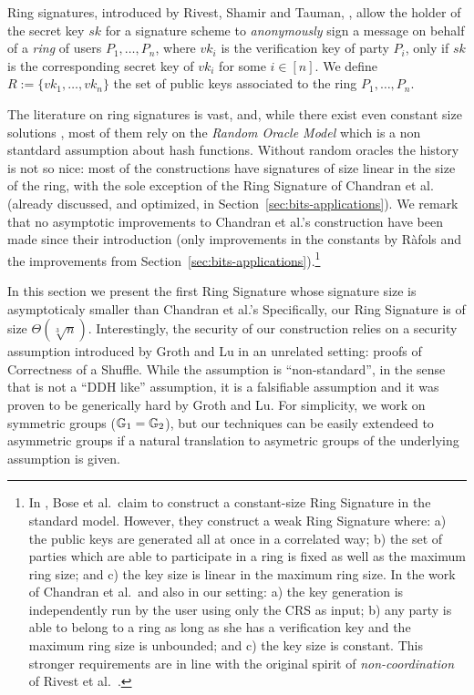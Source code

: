 Ring signatures, introduced by Rivest, Shamir and Tauman, \cite{AC:RivShaTau01}, allow the holder of the secret key $sk$ for a signature scheme to \emph{anonymously} sign a message on behalf of a \emph{ring} of users $P_1,\ldots,P_n$, where $vk_i$ is the verification key of party $P_i$, only if $sk$ is the corresponding secret key of $vk_i$ for some $i\in[n]$. We define $R:=\{vk_1,\ldots,vk_n\}$ the set of public keys associated to the ring $P_1,\ldots,P_n$.

The literature on ring signatures is vast, and, while there exist even constant size solutions \cite{EC:DKNS04}, most of them rely on the \emph{Random Oracle Model} which is a non stantdard assumption about hash functions. Without random oracles the history is not so nice: most of the constructions have signatures of size linear in the size of the ring, with the sole exception of the Ring Signature of Chandran et al.~\cite{ICALP:ChaGroSah07} (already discussed, and optimized, in Section~\ref{sec:bits-applications}). We remark that no asymptotic improvements to Chandran et al.'s construction have been made since their introduction (only improvements in the constants by R\`afols \cite{TCC:Rafols15} and the improvements from Section~\ref{sec:bits-applications}).\footnote{In \cite{ACISP:BosDasRan15}, Bose et al.~claim to construct a constant-size Ring Signature in the standard model. However, they construct a weak Ring Signature where: a) the public keys are generated all at once in a correlated way; b) the set of parties which are able to participate in a ring is fixed as well as the maximum ring size; and c) the key size is linear in the maximum ring size. In the work of Chandran et al.~and also in our setting: a) the key generation is independently run by the user using only the CRS as input; b) any party is able to belong to a ring as long as she has a verification key and the maximum ring size is unbounded; and c) the key size is constant. This stronger requirements are in line with the original spirit of \emph{non-coordination} of  Rivest et al.~\cite{AC:RivShaTau01}.}

In this section we present the first Ring Signature whose signature size is asymptoticaly smaller than Chandran et al.'s Specifically, our Ring Signature is of size $\Theta(\sqrt[3]{n})$. Interestingly, the security of our construction relies on a security assumption introduced by Groth and Lu \cite{AC:GroLu07} in an unrelated setting: proofs of Correctness of a Shuffle. While the assumption is ``non-standard'', in the sense that is not a ``DDH like'' assumption, it is a falsifiable assumption and it was proven to be generically hard by Groth and Lu. For simplicity, we work on symmetric groups ($\mathbb{G}_1=\mathbb{G}_2$), but our techniques can be easily extendeed to asymmetric groups if a natural translation to asymetric groups of the underlying assumption is given.


